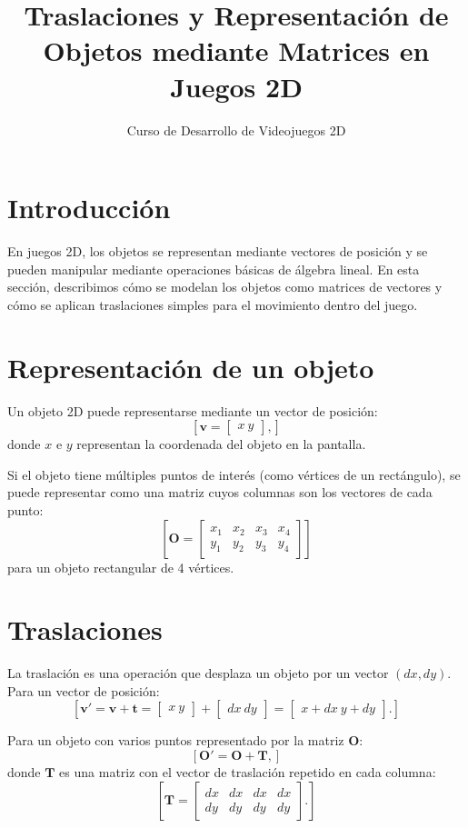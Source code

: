 \documentclass[12pt]{article}
\title{Traslaciones y Representación de Objetos mediante Matrices en Juegos 2D}
\author{Curso de Desarrollo de Videojuegos 2D}
\date{}
\begin{document}
\maketitle

\section*{Introducción}
En juegos 2D, los objetos se representan mediante vectores de posición y se pueden manipular mediante operaciones básicas de álgebra lineal. En esta sección, describimos cómo se modelan los objetos como matrices de vectores y cómo se aplican traslaciones simples para el movimiento dentro del juego.

\section*{Representación de un objeto}
Un objeto 2D puede representarse mediante un vector de posición:
$$
[
\mathbf{v} = \begin{bmatrix} x \ y \end{bmatrix},]
$$
donde $x$ e $y$ representan la coordenada del objeto en la pantalla.

Si el objeto tiene múltiples puntos de interés (como vértices de un rectángulo), se puede representar como una matriz cuyos columnas son los vectores de cada punto:
$$
[
\mathbf{O} = \begin{bmatrix} x_1 & x_2 & x_3 & x_4 \\ y_1 & y_2 & y_3 & y_4 \end{bmatrix}]
$$
para un objeto rectangular de 4 vértices.

\section*{Traslaciones}
La traslación es una operación que desplaza un objeto por un vector $(dx, dy)$. Para un vector de posición:
$$
[
\mathbf{v}' = \mathbf{v} + \mathbf{t} = \begin{bmatrix} x \ y \end{bmatrix} + \begin{bmatrix} dx \ dy \end{bmatrix} = \begin{bmatrix} x + dx \ y + dy \end{bmatrix}.]
$$

Para un objeto con varios puntos representado por la matriz $\mathbf{O}$:
$$
[
\mathbf{O}' = \mathbf{O} + \mathbf{T},]
$$
donde $\mathbf{T}$ es una matriz con el vector de traslación repetido en cada columna:
$$
[
\mathbf{T} = \begin{bmatrix} dx & dx & dx & dx \\ dy & dy & dy & dy \end{bmatrix}.]
$$
\end{document}
